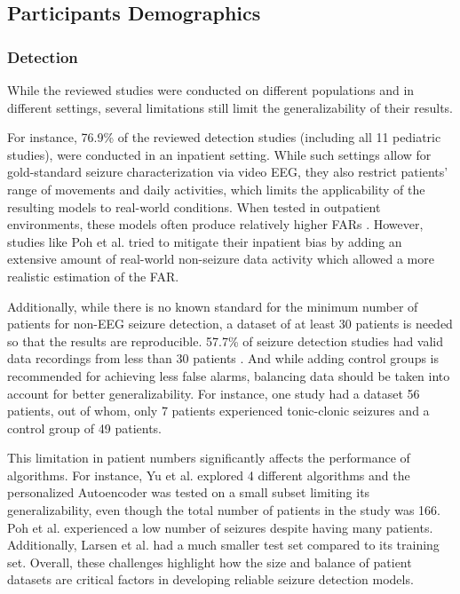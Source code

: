\subsection{Participants Demographics}
\subsubsection{Detection}
While the reviewed studies were conducted on different populations and in different settings, several limitations still limit the generalizability of their results.

For instance, 76.9\% of the reviewed detection studies (including all 11 pediatric studies), were conducted in an inpatient setting. While such settings allow for gold-standard seizure characterization via video EEG, they also restrict patients’ range of movements and daily activities, which limits the applicability of the resulting models to real-world conditions. When tested in outpatient environments, these models often produce relatively higher FARs \cite{Wang2022-lt,Chowdhury2022-bi,Nasseri2021-xn,Regalia2019-ch}. However, studies like Poh et al. \cite{Poh2012-af} tried to mitigate their inpatient bias by adding an extensive amount of real-world non-seizure data activity which allowed a more realistic estimation of the FAR. 

Additionally, while there is no known standard for the minimum number of patients for non-EEG seizure detection, a dataset of at least 30 patients is needed so that the results are reproducible. 57.7\% of seizure detection studies had valid data recordings from less than 30 patients \cite{Cogan2017-lg,Hamlin2021-sd,Wang2022-lt,De_Cooman2018-pq,Wu2024-yl,Chowdhury2022-bi,Ge2023-ab,Nasseri2021-xn,Ali2020-ke,Larsen2024-vn,Dong2022-oo,Li2022-ty,Xu2022-tx,Wang2025-ql,Arends2018-ew}. And while adding control groups is recommended for achieving less false alarms, balancing data should be taken into account for better generalizability. For instance, one study \cite{Milosevic2016-ee} had a dataset 56 patients, out of whom, only 7 patients experienced tonic-clonic seizures and a control group of 49 patients. 

This limitation in patient numbers significantly affects the performance of algorithms. For instance, Yu et al. \cite{Yu2023-ss} explored 4 different algorithms and the personalized Autoencoder was tested on a small subset limiting its generalizability, even though the total number of patients in the study was 166. Poh et al. \cite{Poh2012-af} experienced a low number of seizures despite having many patients. Additionally, Larsen et al. \cite{Larsen2024-vn} had a much smaller test set compared to its training set. Overall, these challenges highlight how the size and balance of patient datasets are critical factors in developing reliable seizure detection models.

